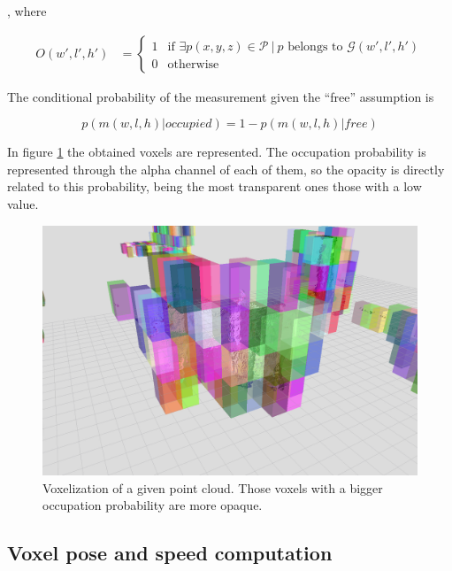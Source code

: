 , where

\begin{equation}\label{eq:cp05_occupied}
\begin{align*}
 O(w', l', h') &=
  \begin{cases}
   1        & \text{if } %
   {\exists p(x, y, z) \in \mathcal{P} ~|~ p \text{ belongs to } \mathcal{G}(w', l', h')}%
   \\
   0        & \text{otherwise}
  \end{cases}
\end{align*}
\end{equation}

The conditional probability of the measurement given the “free” assumption is

\begin{equation}\label{eq:cp05_conditional_prob}
p(m(w,l,h)|occupied) = 1 - p(m(w,l,h)|free)
\end{equation}

In figure \ref{fig:cp05_voxelization} the obtained voxels are represented. The occupation probability is represented through the alpha channel of each of them, so the opacity is directly related to this probability, being the most transparent ones those with a low value.

\begin{figure}[th]
  \centering
  \includegraphics{voxelization}
  \caption{Voxelization of a given point cloud. Those voxels with a bigger occupation probability are more opaque. }\label{fig:cp05_voxelization}
\end{figure}

\subsection{Voxel pose and speed computation}\label{ch:chapter05_01_04}

